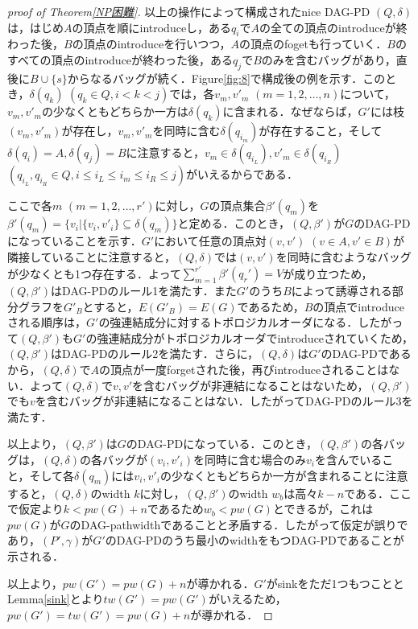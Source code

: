 \documentclass[master]{kuisthesis}		%
\theoremstyle{plain}
\theoremstyle{definition}
\begin{document}
\begin{proof}[proof of Theorem\ref{NP困難}]
    以上の操作によって構成されたnice DAG-PD $(Q, \delta)$は，はじめ$A$の頂点を順にintroduceし，ある$q_i$で$A$の全ての頂点のintroduceが終わった後，$B$の頂点のintroduceを行いつつ，$A$の頂点のfogetも行っていく．$B$のすべての頂点のintroduceが終わった後，ある$q_j$で$B$のみを含むバッグがあり，直後に$B \cup \{s\}$からなるバッグが続く．Figure\ref{fig:8}で構成後の例を示す．このとき，$\delta(q_k)$ $(q_k \in Q, i < k < j)$では，各$v_m, v'_m$ $(m = 1, 2, \dots, n)$について，$v_m, v'_m$の少なくともどちらか一方は$\delta(q_k)$に含まれる．なぜならば，$G'$には枝$(v_m, v'_m)$が存在し，$v_m, v'_m$を同時に含む$\delta(q_{i_m})$が存在すること，そして$\delta(q_i) = A, \delta(q_j) = B$に注意すると，$v_m \in \delta(q_{i_L}), v'_m \in \delta(q_{i_R})$ $(q_{i_L}, q_{i_R} \in Q, i \leq i_L \leq i_m \leq i_R \leq j)$がいえるからである．
    
    ここで各$m$ $(m = 1, 2, \dots, r')$に対し，$G$の頂点集合$\beta'(q_m)$を$\beta'(q_m) = \{v_i | \{v_i, v'_i\} \subseteq \delta(q_m) \}$と定める．このとき，$(Q, \beta')$が$G$のDAG-PDになっていることを示す．$G'$において任意の頂点対$(v, v')$ $(v \in A, v' \in B)$が隣接していることに注意すると，$(Q, \delta)$では$(v, v')$を同時に含むようなバッグが少なくとも1つ存在する．よって$\sum_{m=1}^{r'}\beta'(q_r') = V$が成り立つため，$(Q, \beta')$はDAG-PDのルール1を満たす．また$G'$のうち$B$によって誘導される部分グラフを$G'_B$とすると，$E(G'_B) = E(G)$であるため，$B$の頂点でintroduceされる順序は，$G'$の強連結成分に対するトポロジカルオーダになる．したがって$(Q, \beta')$も$G'$の強連結成分がトポロジカルオーダでintroduceされていくため，$(Q, \beta')$はDAG-PDのルール2を満たす．さらに，$(Q, \delta)$は$G'$のDAG-PDであるから，$(Q, \delta)$で$A$の頂点が一度forgetされた後，再びintroduceされることはない．よって$(Q, \delta)$で${v, v'}$を含むバッグが非連結になることはないため，$(Q, \beta')$でも$v$を含むバッグが非連結になることはない．したがってDAG-PDのルール3を満たす．

    以上より，$(Q, \beta')$は$G$のDAG-PDになっている．このとき，$(Q, \beta')$の各バッグは，$(Q, \delta)$の各バッグが$(v_i, v'_i)$を同時に含む場合のみ$v_i$を含んでいること，そして各$\delta(q_m)$には$v_i, v'_i$の少なくともどちらか一方が含まれることに注意すると，$(Q, \delta)$のwidth $k$に対し，$(Q, \beta')$のwidth $w_b$は高々$k - n$である．ここで仮定より$k < pw(G) + n$であるため$w_b < pw(G)$とできるが，これは$pw(G)$が$G$のDAG-pathwidthであることと矛盾する．したがって仮定が誤りであり，$(P', \gamma)$が$G'$のDAG-PDのうち最小のwidthをもつDAG-PDであることが示される．
    
    以上より，$pw(G') = pw(G) + n$が導かれる．$G'$がsinkをただ1つもつこととLemma\ref{sink}とより$tw(G') = pw(G')$がいえるため，$pw(G') = tw(G') = pw(G) + n$が導かれる．
    
\end{proof}
\end{document}

